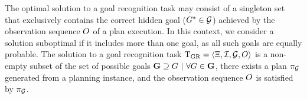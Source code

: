 The optimal solution to a goal recognition task may consist of a singleton set that exclusively contains the correct hidden goal ($G^{*}\in\mathcal{G}$) achieved by the observation sequence $O$ of a plan execution.  In this context, we consider a solution suboptimal if it includes more than one goal, as all such goals are equally probable.
The solution to a goal recognition task $\text{T}_{\text{GR}}=\left\langle\Xi,\mathcal{I},\mathcal{G},O\right\rangle$ is a non-empty subset of the set of possible goals $\textbf{G}\supseteq G~\vert~\forall G\in\textbf{G}$, there exists a plan $\pi_{\mathcal{G}}$ generated from a planning instance, and the observation sequence $O$ is satisfied by $\pi_{\mathcal{G}}$.